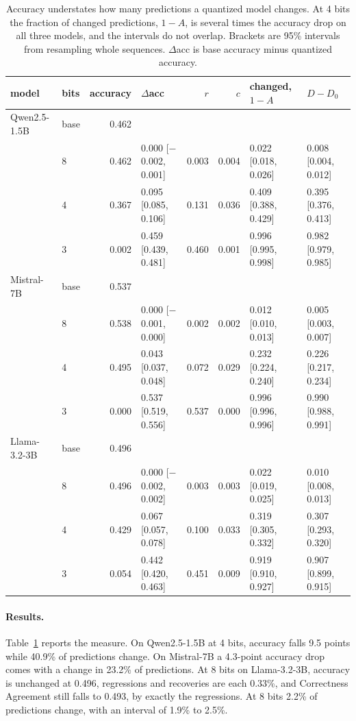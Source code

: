 \documentclass[journal,onecolumn]{IEEEtran}
\begin{document}
\begin{table}[h]
\centering
\caption{Accuracy understates how many predictions a quantized model changes. At 4 bits the
fraction of changed predictions, $1-A$, is several times the accuracy drop on all three models,
and the intervals do not overlap. Brackets are 95\% intervals from resampling whole sequences.
$\Delta$acc is base accuracy minus quantized accuracy.}
\label{tab:agree}
\footnotesize
\setlength{\tabcolsep}{4pt}
\begin{tabular}{llrlrrll}
\toprule
model & bits & accuracy & $\Delta$acc & $r$ & $c$ & changed, $1-A$ & $D - D_0$ \\
\midrule
Qwen2.5-1.5B & base & 0.462 & & & & & \\
 & 8 & 0.462 & 0.000 [$-$0.002, 0.001] & 0.003 & 0.004 & 0.022 [0.018, 0.026] & 0.008 [0.004, 0.012] \\
 & 4 & 0.367 & 0.095 [0.085, 0.106] & 0.131 & 0.036 & 0.409 [0.388, 0.429] & 0.395 [0.376, 0.413] \\
 & 3 & 0.002 & 0.459 [0.439, 0.481] & 0.460 & 0.001 & 0.996 [0.995, 0.998] & 0.982 [0.979, 0.985] \\
\midrule
Mistral-7B & base & 0.537 & & & & & \\
 & 8 & 0.538 & 0.000 [$-$0.001, 0.000] & 0.002 & 0.002 & 0.012 [0.010, 0.013] & 0.005 [0.003, 0.007] \\
 & 4 & 0.495 & 0.043 [0.037, 0.048] & 0.072 & 0.029 & 0.232 [0.224, 0.240] & 0.226 [0.217, 0.234] \\
 & 3 & 0.000 & 0.537 [0.519, 0.556] & 0.537 & 0.000 & 0.996 [0.996, 0.996] & 0.990 [0.988, 0.991] \\
\midrule
Llama-3.2-3B & base & 0.496 & & & & & \\
 & 8 & 0.496 & 0.000 [$-$0.002, 0.002] & 0.003 & 0.003 & 0.022 [0.019, 0.025] & 0.010 [0.008, 0.013] \\
 & 4 & 0.429 & 0.067 [0.057, 0.078] & 0.100 & 0.033 & 0.319 [0.305, 0.332] & 0.307 [0.293, 0.320] \\
 & 3 & 0.054 & 0.442 [0.420, 0.463] & 0.451 & 0.009 & 0.919 [0.910, 0.927] & 0.907 [0.899, 0.915] \\
\bottomrule
\end{tabular}
\end{table}

\paragraph{Results.} Table~\ref{tab:agree} reports the measure. On Qwen2.5-1.5B at 4 bits,
accuracy falls 9.5 points while 40.9\% of predictions change. On Mistral-7B a 4.3-point
accuracy drop comes with a change in 23.2\% of predictions. At 8 bits on Llama-3.2-3B,
accuracy is unchanged at 0.496, regressions and recoveries are each 0.33\%, and Correctness
Agreement still falls to 0.493, by exactly the regressions. At 8 bits 2.2\% of predictions
change, with an interval of 1.9\% to 2.5\%.
\end{document}
